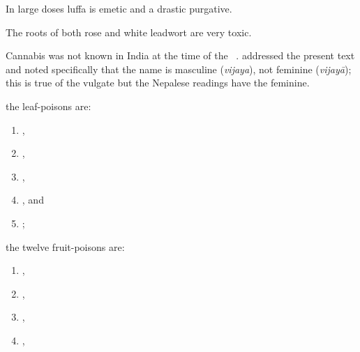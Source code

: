 \begin{translation}
\begin{itemize}
\begin{enumerate}
{        In
        large doses luffa is emetic and a drastic purgative. 
        
        The roots of both
        rose and white leadwort are very toxic.  
        
        Cannabis was not 
        known in India at the time of the \SS\ 
        \parencites{wuja-cann}[270]{mchu-2021a}.  \citet[61, note 3]{meul-sear} 
        addressed the present text and noted specifically that the name is 
        masculine (\emph{vijaya}), 
        not feminine (\emph{vijayā}); this is true of the vulgate but the Nepalese 
        readings have the 
        feminine.}
        \end{enumerate}
        \end{itemize}
    
        \item
        the  leaf-poisons are:
             \begin{enumerate}
            
        \item {},
        \item {},
        \item {},
        \item {},
        and
        \item {};
            \end{enumerate}
        \item
        the twelve fruit-poisons are:
            \begin{enumerate}
         \item 
        ,
        \item {},
        \item {}, \item 
            ,
        

\end{enumerate}
\end{translation}
